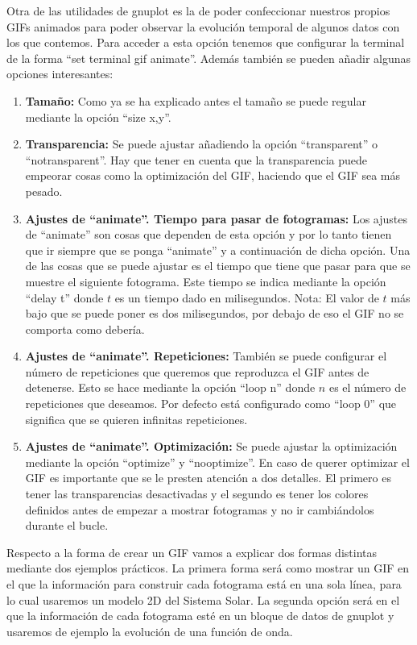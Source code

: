 \documentclass[11pt,a4paper,twoside,pdf]{article}
\numberwithin{equation}{section}
\begin{document}
Otra de las utilidades de gnuplot es la de poder confeccionar nuestros propios GIFs animados para poder observar la evolución temporal de algunos datos con los que contemos. Para acceder a esta opción tenemos que configurar la terminal de la forma ``set terminal gif animate''. Además también se pueden añadir algunas opciones interesantes:

\begin{enumerate}
	\item \textbf{Tamaño:} Como ya se ha explicado antes el tamaño se puede regular mediante la opción ``size x,y''.
	\item \textbf{Transparencia:} Se puede ajustar añadiendo la opción ``transparent'' o ``notransparent''. Hay que tener en cuenta que la transparencia puede empeorar cosas como la optimización del GIF, haciendo que el GIF sea más pesado.
	\item \textbf{Ajustes de ``animate''. Tiempo para pasar de fotogramas:} Los ajustes de ``animate'' son cosas que dependen de esta opción y por lo tanto tienen que ir siempre que se ponga ``animate'' y a continuación de dicha opción. Una de las cosas que se puede ajustar es el tiempo que tiene que pasar para que se muestre el siguiente fotograma. Este tiempo se indica mediante la opción ``delay t'' donde $t$ es un tiempo dado en milisegundos. Nota: El valor de $t$ más bajo que se puede poner es dos milisegundos, por debajo de eso el GIF no se comporta como debería.
	\item \textbf{Ajustes de ``animate''. Repeticiones:} También se puede configurar el número de repeticiones que queremos que reproduzca el GIF antes de detenerse. Esto se hace mediante la opción ``loop n'' donde $n$ es el número de repeticiones que deseamos. Por defecto está configurado como ``loop 0'' que significa que se quieren infinitas repeticiones.
	\item \textbf{Ajustes de ``animate''. Optimización:} Se puede ajustar la optimización mediante la opción ``optimize'' y ``nooptimize''. En caso de querer optimizar el GIF es importante que se le presten atención a dos detalles. El primero es tener las transparencias desactivadas y el segundo es tener los colores definidos antes de empezar a mostrar fotogramas y no ir cambiándolos durante el bucle.
\end{enumerate}

Respecto a la forma de crear un GIF vamos a explicar dos formas distintas mediante dos ejemplos prácticos. La primera forma será como mostrar un GIF en el que la información para construir cada fotograma está en una sola línea, para lo cual usaremos un modelo 2D del Sistema Solar. La segunda opción será en el que la información de cada fotograma esté en un bloque de datos de gnuplot y usaremos de ejemplo la evolución de una función de onda.
\end{document}
